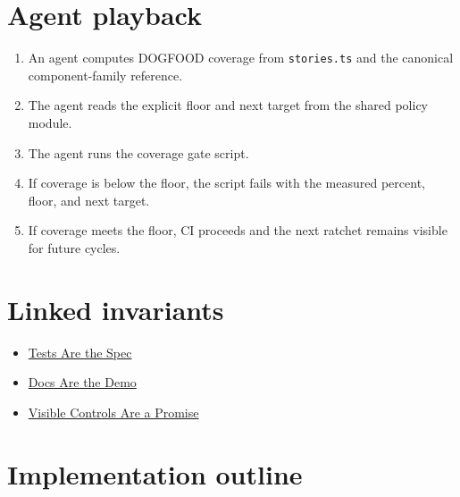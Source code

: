 \section{Agent playback}\label{record-065-agent-playback}

\begin{enumerate}
\def\labelenumi{\arabic{enumi}.}
\tightlist
\item
  An agent computes DOGFOOD coverage from \texttt{s\allowbreak{}t\allowbreak{}o\allowbreak{}r\allowbreak{}i\allowbreak{}e\allowbreak{}s\allowbreak{}.\allowbreak{}t\allowbreak{}s} and the canonical component-family reference.
\item
  The agent reads the explicit floor and next target from the shared policy module.
\item
  The agent runs the coverage gate script.
\item
  If coverage is below the floor, the script fails with the measured percent, floor, and next target.
\item
  If coverage meets the floor, CI proceeds and the next ratchet remains visible for future cycles.
\end{enumerate}

\section{Linked invariants}\label{record-065-linked-invariants}

\begin{itemize}
\tightlist
\item
  \href{https://github.com/flyingrobots/bijou/blob/cbd70612140e7a450d764b3c7be1c6af878b99bc/docs/invariants/tests-are-the-spec.md}{Tests Are the Spec}
\item
  \href{https://github.com/flyingrobots/bijou/blob/cbd70612140e7a450d764b3c7be1c6af878b99bc/docs/invariants/docs-are-the-demo.md}{Docs Are the Demo}
\item
  \href{https://github.com/flyingrobots/bijou/blob/cbd70612140e7a450d764b3c7be1c6af878b99bc/docs/invariants/visible-controls-are-a-promise.md}{Visible Controls Are a Promise}
\end{itemize}

\section{Implementation outline}\label{record-065-implementation-outline}

